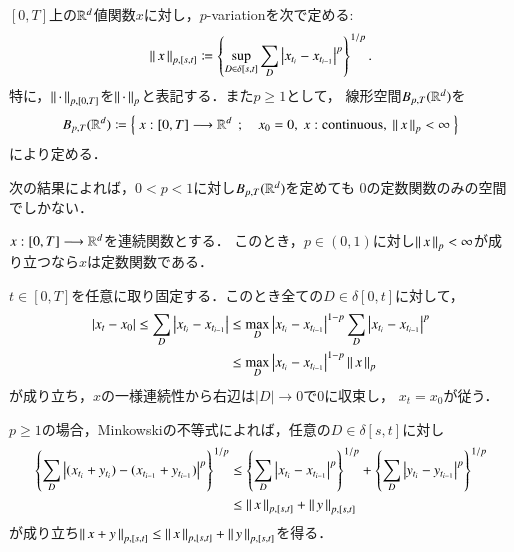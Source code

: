 \begin{screen}
	\begin{dfn}[$p$-variation]
		$[0,T]$上の$\mathbb{R}^d$値関数$x$に対し，$p$-variationを次で定める:
		\begin{align}
			\left\|\, x\, \right\|_{p,[s,t]}
			\coloneqq \left\{ \operatorname*{sup}_{D \in \delta[s,t]} \sum_{D} 
				\left| x_{t_i} - x_{t_{i-1}} \right|^p \right\}^{1/p}.
		\end{align}
		特に，$\left\|\, \cdot\, \right\|_{p,[0,T]}$を$\left\|\, \cdot\, \right\|_{p}$と表記する．また$p \geq 1$として，
		線形空間$B_{p,T}(\mathbb{R}^d)$を
		\begin{align}
			B_{p,T}(\R^d)
			\coloneqq \Set{x:[0,T] \longrightarrow \R^d}{x_0=0,\ x:\mbox{continuous},\ \Norm{x}{p} < \infty}
		\end{align}
		により定める．
	\end{dfn}
\end{screen}

次の結果によれば，$0 < p < 1$に対し$B_{p,T}(\mathbb{R}^d)$を定めても
$0$の定数関数のみの空間でしかない．
\begin{screen}
	\begin{thm}
		$x:[0,T] \longrightarrow \mathbb{R}^d$を連続関数とする．
		このとき，$p \in (0, 1)$に対し$\left\|\, x\, \right\|_{p} < \infty$が成り立つなら$x$は定数関数である．
	\end{thm}
\end{screen}

\begin{prf}
	$t \in [0,T]$を任意に取り固定する．このとき全ての$D \in \delta[0,t]$に対して，
	\begin{align}
		|x_t - x_0| \leq \sum_D \left| x_{t_i} - x_{t_{i-1}} \right|
		&\leq \operatorname*{max}_{D} \left| x_{t_i} - x_{t_{i-1}} \right|^{1-p} 
			\sum_D \left| x_{t_i} - x_{t_{i-1}} \right|^p \\
		&\leq \operatorname*{max}_{D} \left| x_{t_i} - x_{t_{i-1}} \right|^{1-p} \left\|\, x\, \right\|_{p}
	\end{align}
	が成り立ち，$x$の一様連続性から右辺は$|D| \longrightarrow 0$で$0$に収束し，
	$x_t = x_0$が従う．
	\QED
\end{prf}

$p \geq 1$の場合，Minkowskiの不等式によれば，任意の$D \in \delta[s,t]$に対し
\begin{align}
	\left\{ \sum_D \left| (x_{t_i} + y_{t_i}) - (x_{t_{i-1}} + y_{t_{i-1}}) \right|^p \right\}^{1/p}
	&\leq \left\{ \sum_D \left| x_{t_i} - x_{t_{i-1}} \right|^p \right\}^{1/p}
		+ \left\{ \sum_D \left| y_{t_i} - y_{t_{i-1}} \right|^p \right\}^{1/p} \\
	&\leq \left\|\, x\, \right\|_{p,[s,t]} + \left\|\, y\, \right\|_{p,[s,t]}
\end{align}
が成り立ち$\left\|\, x + y\, \right\|_{p,[s,t]} \leq \left\|\, x\, \right\|_{p,[s,t]} + \left\|\, y\, \right\|_{p,[s,t]}$を得る．

